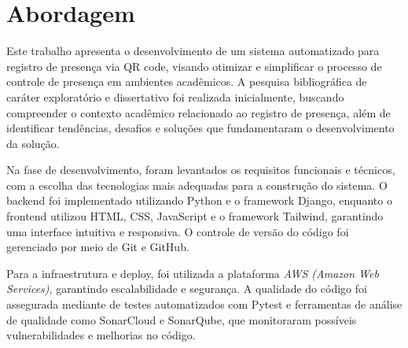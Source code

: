 \section{Abordagem}
\label{sec:abordagem}

Este trabalho apresenta o desenvolvimento de um sistema automatizado para registro de presença via QR code, visando otimizar e simplificar o processo de controle de presença em ambientes acadêmicos. A pesquisa bibliográfica de caráter exploratório e dissertativo foi realizada inicialmente, buscando compreender o contexto acadêmico relacionado ao registro de presença, além de identificar tendências, desafios e soluções que fundamentaram o desenvolvimento da solução.

Na fase de desenvolvimento, foram levantados os requisitos funcionais e técnicos, com a escolha das tecnologias mais adequadas para a construção do sistema. O backend foi implementado utilizando Python e o framework Django, enquanto o frontend utilizou HTML, CSS, JavaScript e o framework Tailwind, garantindo uma interface intuitiva e responsiva. O controle de versão do código foi gerenciado por meio de Git e GitHub.

Para a infraestrutura e deploy, foi utilizada a plataforma \textit{AWS (Amazon Web Services)}, garantindo escalabilidade e segurança. A qualidade do código foi assegurada mediante de testes automatizados com Pytest e ferramentas de análise de qualidade como SonarCloud e SonarQube, que monitoraram possíveis vulnerabilidades e melhorias no código.
